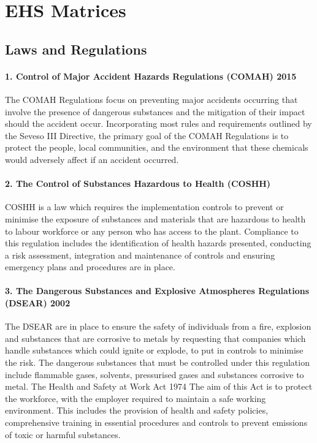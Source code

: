 \section{EHS Matrices}
\label{app:EHS}

\subsection{Laws and Regulations }

\paragraph{1. Control of Major Accident Hazards Regulations (COMAH) 2015} 

The COMAH Regulations focus on preventing major accidents occurring that involve the presence of dangerous substances and the mitigation of their impact should the accident occur. Incorporating most rules and requirements outlined by the Seveso III Directive, the primary goal of the COMAH Regulations is to protect the people, local communities, and the environment that these chemicals would adversely affect if an accident occurred. 

\paragraph{2. The Control of Substances Hazardous to Health (COSHH) }

COSHH is a law which requires the implementation controls to prevent or minimise the exposure of substances and materials that are hazardous to health to labour workforce or any person who has access to the plant. Compliance to this regulation includes the identification of health hazards presented, conducting a risk assessment, integration and maintenance of controls and ensuring emergency plans and procedures are in place. 

\paragraph{3. The Dangerous Substances and Explosive Atmospheres Regulations (DSEAR) 2002}

The DSEAR are in place to ensure the safety of individuals from a fire, explosion and substances that are corrosive to metals by requesting that companies which handle substances which could ignite or explode, to put in controls to minimise the risk. The dangerous substances that must be controlled under this regulation include flammable gases, solvents, pressurised gases and substances corrosive to metal. 
The Health and Safety at Work Act 1974
The aim of this Act is to protect the workforce, with the employer required to maintain a safe working environment. This includes the provision of health and safety policies, comprehensive training in essential procedures and controls to prevent emissions of toxic or harmful substances.

